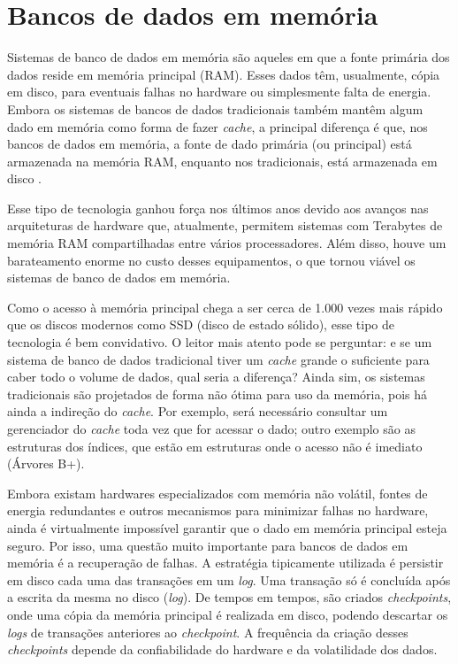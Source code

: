 \section{Bancos de dados em memória}
\label{sec:memoria}

Sistemas de banco de dados em memória são aqueles em que a fonte primária dos dados reside 
em memória principal (RAM). Esses dados têm, usualmente, cópia em disco, para eventuais falhas 
no hardware ou simplesmente falta de energia. Embora os sistemas de bancos de dados tradicionais 
também mantêm algum dado em memória como forma de fazer \textit{cache}, a principal diferença é 
que, nos bancos de dados em memória, a fonte de dado primária (ou principal) está 
armazenada na memória RAM, enquanto nos tradicionais, está armazenada em disco 
\cite{garcia1992main, dewitt1984implementation}.

Esse tipo de tecnologia ganhou força nos últimos anos devido aos avanços nas arquiteturas de 
hardware que, atualmente, permitem sistemas com Terabytes de memória RAM compartilhadas entre 
vários processadores. Além disso, houve um barateamento enorme no custo desses equipamentos, o 
que tornou viável os sistemas de banco de dados em memória. 

Como o acesso à memória principal chega a ser cerca de 1.000 vezes mais rápido que os discos modernos 
como SSD (disco de estado sólido), esse tipo de tecnologia é bem convidativo. O leitor mais atento 
pode se perguntar: e se um sistema de banco de dados tradicional tiver um \textit{cache} grande o 
suficiente para caber todo o volume de dados, qual seria a diferença? Ainda sim, os sistemas tradicionais são 
projetados de forma não ótima para uso da memória, pois há ainda a indireção do \textit{cache}. 
Por exemplo, será necessário consultar um gerenciador do \textit{cache} toda vez que for acessar o dado;
outro exemplo são as estruturas dos índices, que estão em estruturas onde o acesso não é imediato (Árvores B+). 

Embora existam hardwares especializados com memória não volátil, fontes de energia redundantes e 
outros mecanismos para minimizar falhas no hardware, ainda é virtualmente impossível garantir que o 
dado em memória principal esteja seguro. Por isso, uma questão muito importante para bancos de dados 
em memória é a recuperação de falhas. A estratégia tipicamente utilizada 
é persistir em disco cada uma das transações em um \textit{log}. Uma transação só é concluída após a 
escrita da mesma no disco (\textit{log}). De tempos em tempos, são criados \textit{checkpoints}, onde 
uma cópia da memória principal é realizada em disco, podendo descartar os \textit{logs} de transações 
anteriores ao \textit{checkpoint}. A frequência da criação desses \textit{checkpoints} depende da 
confiabilidade do hardware e da volatilidade dos dados.

